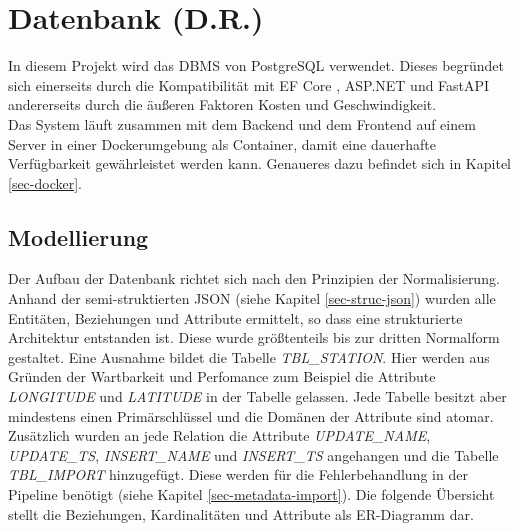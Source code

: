 \section{Datenbank (D.R.)}
\label{sec-db}
In diesem Projekt wird das DBMS von PostgreSQL \cite{postgresql} verwendet. Dieses begründet sich einerseits durch die Kompatibilität mit EF Core \cite{ajcvickers}, ASP.NET \Cite{wadepickett} und FastAPI \cite{fastapi} andererseits
durch die äußeren Faktoren Kosten und Geschwindigkeit. ~\\
Das System läuft zusammen mit dem Backend und dem Frontend auf einem Server in einer Dockerumgebung als Container, damit eine dauerhafte Verfügbarkeit gewährleistet werden kann.
Genaueres dazu befindet sich in Kapitel \ref{sec-docker}.

\subsection{Modellierung}
\label{sec-db-modell}
Der Aufbau der Datenbank richtet sich nach den Prinzipien der Normalisierung. Anhand der semi-struktierten JSON \cite{json}  (siehe Kapitel \ref{sec-struc-json}) wurden alle Entitäten, Beziehungen und
Attribute ermittelt, so dass eine strukturierte Architektur entstanden ist. Diese wurde größtenteils bis zur dritten Normalform gestaltet. Eine Ausnahme bildet die Tabelle \textit{TBL\_STATION}.
Hier werden aus Gründen der Wartbarkeit und Perfomance zum Beispiel die Attribute \textit{LONGITUDE} und \textit{LATITUDE} in der Tabelle gelassen. Jede Tabelle besitzt aber mindestens einen Primärschlüssel und die Domänen der Attribute sind atomar. 
Zusätzlich wurden an jede Relation die Attribute \textit{UPDATE\_NAME}, \textit{UPDATE\_TS}, \textit{INSERT\_NAME} und \textit{INSERT\_TS} angehangen und die Tabelle \textit{TBL\_IMPORT} hinzugefügt. Diese werden für die Fehlerbehandlung in der Pipeline benötigt (siehe Kapitel \ref{sec-metadata-import}).
Die folgende Übersicht stellt die Beziehungen, Kardinalitäten und Attribute als ER-Diagramm dar.
